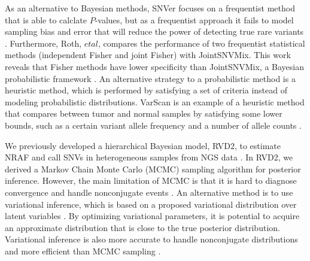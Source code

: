 \documentclass[11pt,reqno]{amsart}
\begin{document}
As an alternative to Bayesian methods, SNVer focuses on a frequentist method that is able to calclate $P$-values, but as a frequentist approach it fails to model sampling bias and error that will reduce the power of detecting true rare variants \citep{wei2011snver}.
Furthermore, Roth, $\mathit{et} \mathit{al}$, compares the performance of two frequentist statistical methods (independent Fisher and joint Fisher) with JointSNVMix.
This work reveals that Fisher methods have lower specificity than JointSNVMix, a Bayesian probabilistic framework \citep{roth2012jointsnvmix}.
An alternative strategy to a probabilistic method is a heuristic method, which is performed by satisfying a set of criteria instead of modeling probabilistic distributions.
VarScan is an example of a heuristic method that compares between tumor and normal samples by satisfying some lower bounds, such as a certain variant allele frequency and a number of allele counts \citep{koboldt2012varscan}.

We previously developed a hierarchical Bayesian model, RVD2, to estimate NRAF and call SNVs in heterogeneous samples from NGS data \citep{he2015rvd2}.
In RVD2, we derived a Markov Chain Monte Carlo (MCMC) sampling algorithm for posterior inference.
However, the main limitation of MCMC is that it is hard to diagnose convergence and handle nonconjugate events \citep{jordan1999introduction}.
An alternative method is to use variational inference, which is based on a proposed variational distribution over latent variables \citep{jordan1999introduction}.
By optimizing variational parameters, it is potential to acquire an approximate distribution that is close to the true posterior distribution.
Variational inference is also more accurate to handle nonconjugate distributions and more efficient than MCMC sampling \citep{peterson1989explorations}.
\end{document}
